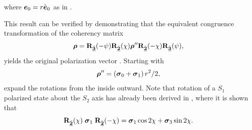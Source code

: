%
where $\Jcol{e}_0 = r \hat{\Jcol{e}}_0$ as in .

This result can be verified by demonstrating that the equivalent congruence transformation of the coherency matrix
%
\begin{equation}
\cohM{\rho}=\vRotation[3](-\psi) \vRotation[2](\chi) \cohM{\rho}'' \vRotation[2](-\chi) \vRotation[3](\psi),
\label{eqn:double_check}
\end{equation}
%
yields the original polarization vector .
%
Starting with 
\begin{equation}
	\cohM{\rho}'' = \left( \pauli{0} + \pauli{1} \right) r^2 / 2,
\end{equation}
%
expand the rotations from the inside outward.  
%
Note that rotation of a $S_1$ polarized state about the $S_2$ axis
has already been derived in , where it is shown that
%
\begin{equation}
\vRotation[2](\chi) \; \pauli{1} \; \vRotation[2](-\chi) = \pauli{1} \cos2\chi  + \pauli{3} \sin2\chi.
\end{equation}
%

